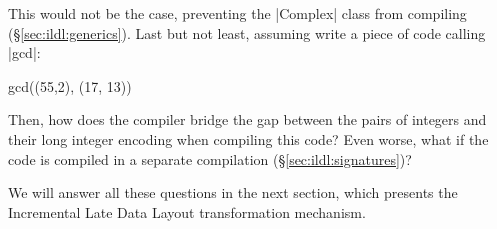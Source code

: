 This would not be the case, preventing the |Complex| class from compiling (\S\ref{sec:ildl:generics}). Last but not least, assuming write a piece of code calling |gcd|:

\begin{lstlisting-nobreak}
gcd((55,2), (17, 13))
\end{lstlisting-nobreak}

Then, how does the compiler bridge the gap between the pairs of integers and their long integer encoding when compiling this code? Even worse, what if the code is compiled in a separate compilation (\S\ref{sec:ildl:signatures})?

We will answer all these questions in the next section, which presents the Incremental Late Data Layout transformation mechanism.